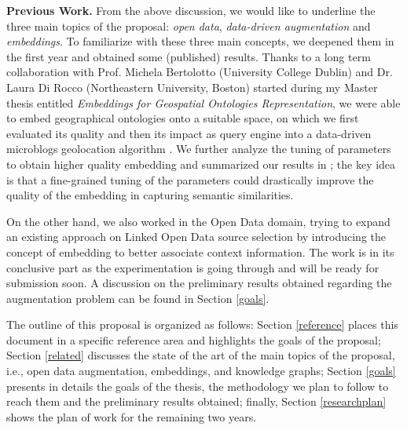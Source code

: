 \bigbreak
\textbf{Previous Work.} From the above discussion, we would like to underline the three main topics of the proposal: \textit{open data}, \textit{data-driven augmentation} and \textit{embeddings}. To familiarize with these three main concepts, we deepened them in the first year and obtained some (published) results. Thanks to a long term collaboration with Prof. Michela Bertolotto (University College Dublin) and Dr. Laura Di Rocco (Northeastern University, Boston) started during my Master thesis entitled \textit{Embeddings for Geospatial Ontologies Representation}, we were able to embed geographical ontologies onto a suitable space, on which we first evaluated its quality \cite{dassereto2019evaluating} and then its impact as query engine into a data-driven microblogs geolocation algorithm \cite{di2020sherloc}. We further analyze the tuning of parameters to obtain higher quality embedding and summarized our results in \cite{dassereto2020tuning}; the key idea is that a fine-grained tuning of the parameters could drastically improve the quality of the embedding in capturing semantic similarities.

On the other hand, we also worked in the Open Data domain, trying to expand an existing approach on Linked Open Data source selection \cite{beyza2019linked} by introducing the concept of embedding to better associate context information. The work is in its conclusive part as the experimentation is going through and will be ready for submission soon. A discussion on the preliminary results obtained regarding the augmentation problem can be found in Section \ref{goals}.

The outline of this proposal is organized as follows: Section \ref{reference} places this document in a specific reference area and highlights the goals of the proposal; Section \ref{related} discusses the state of the art of the main topics of the proposal, i.e., open data augmentation, embeddings, and knowledge graphs; Section \ref{goals} presents in details the goals of the thesis, the methodology we plan to follow to reach them and the preliminary results obtained; finally, Section \ref{researchplan} shows the plan of work for the remaining two years. 
\bigbreak 


